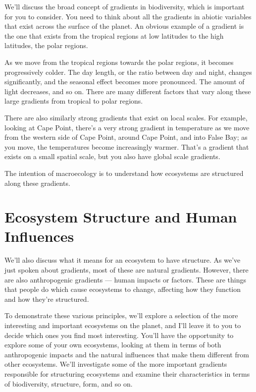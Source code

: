 \documentclass[
  10pt,
]{book}
\begin{document}
We'll discuss the broad concept of gradients in biodiversity, which is
important for you to consider. You need to think about all the gradients
in abiotic variables that exist across the surface of the planet. An
obvious example of a gradient is the one that exists from the tropical
regions at low latitudes to the high latitudes, the polar regions.

As we move from the tropical regions towards the polar regions, it
becomes progressively colder. The day length, or the ratio between day
and night, changes significantly, and the seasonal effect becomes more
pronounced. The amount of light decreases, and so on. There are many
different factors that vary along these large gradients from tropical to
polar regions.

There are also similarly strong gradients that exist on local scales.
For example, looking at Cape Point, there's a very strong gradient in
temperature as we move from the western side of Cape Point, around Cape
Point, and into False Bay; as you move, the temperatures become
increasingly warmer. That's a gradient that exists on a small spatial
scale, but you also have global scale gradients.

The intention of macroecology is to understand how ecosystems are
structured along these gradients.

\section{Ecosystem Structure and Human
Influences}\label{ecosystem-structure-and-human-influences}

We'll also discuss what it means for an ecosystem to have structure. As
we've just spoken about gradients, most of these are natural gradients.
However, there are also anthropogenic gradients --- human impacts or
factors. These are things that people do which cause ecosystems to
change, affecting how they function and how they're structured.

To demonstrate these various principles, we'll explore a selection of
the more interesting and important ecosystems on the planet, and I'll
leave it to you to decide which ones you find most interesting. You'll
have the opportunity to explore some of your own ecosystems, looking at
them in terms of both anthropogenic impacts and the natural influences
that make them different from other ecosystems. We'll investigate some
of the more important gradients responsible for structuring ecosystems
and examine their characteristics in terms of biodiversity, structure,
form, and so on.
\end{document}
